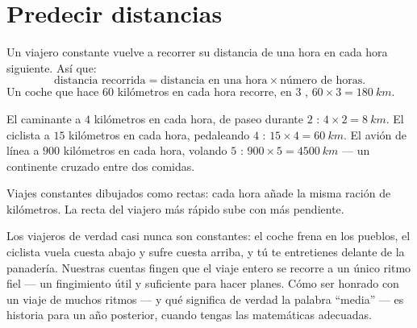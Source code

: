 \section{Predecir distancias}

\begin{proposition}\label{prop:g5:speed-distance-time:distance}
Un viajero constante vuelve a recorrer su distancia de una hora en
cada hora siguiente. Así que:
\[
\text{distancia recorrida} = \text{distancia en una hora} \times
\text{número de horas}.
\]
Un coche que hace $60$ kilómetros en cada hora recorre, en $3$
, $60 \times 3 = \qty{180}{km}$.
\end{proposition}

\begin{example}\label{ex:g5:speed-distance-time:journeys}
El caminante a $4$ kilómetros en cada hora, de paseo durante $2$
: $4 \times 2 = \qty{8}{km}$. El ciclista a $15$ kilómetros en
cada hora, pedaleando $4$ : $15 \times 4 = \qty{60}{km}$. El
avión de línea a $900$ kilómetros en cada hora, volando $5$
: $900 \times 5 = \qty{4500}{km}$ --- un continente cruzado
entre dos comidas.
\end{example}

\begin{omfigure}

{\small Viajes constantes dibujados como rectas: cada hora añade la
misma ración de kilómetros. La recta del viajero más rápido sube con
más pendiente.}
\end{omfigure}

\begin{remark}\label{rem:g5:speed-distance-time:steady}
Los viajeros de verdad casi nunca son constantes: el coche frena en
los pueblos, el ciclista vuela cuesta abajo y sufre cuesta arriba, y
tú te entretienes delante de la panadería. Nuestras cuentas fingen que
el viaje entero se recorre a un único ritmo fiel --- un fingimiento
útil y suficiente para hacer planes. Cómo ser honrado con un viaje de
muchos ritmos --- y qué significa de verdad la palabra ``media'' ---
es historia para un año posterior, cuando tengas las matemáticas
adecuadas.
\end{remark}

